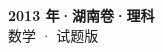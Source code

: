 \documentclass[zihao=-4, a4paper]{ctexart}
\begin{document}
\begin{center}
  {\Large\bfseries 2013 年·湖南卷·理科}\\[4pt]
  {\large 数学 · 试题版}
\end{center}
\medskip
{}

\end{document}
